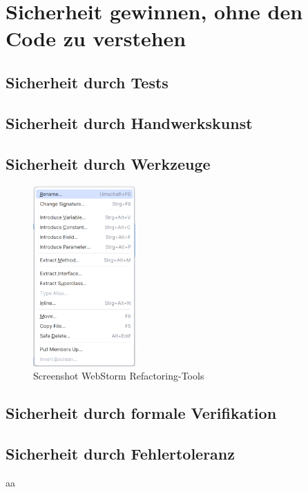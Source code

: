 \chapter{Sicherheit gewinnen, ohne den Code zu verstehen}
\section{Sicherheit durch Tests}
\section{Sicherheit durch Handwerkskunst}
\section{Sicherheit durch Werkzeuge}
\lipsum[1] %

\begin{figure}
  \centering
  \includegraphics[width=0.35\textwidth]{Bilder/screenshotWebstorm} %
  \caption{Screenshot WebStorm Refactoring-Tools \cite{webstorm.2024}}
\end{figure}

\lipsum[2-4] %
\section{Sicherheit durch formale Verifikation}
\section{Sicherheit durch Fehlertoleranz}
aa
